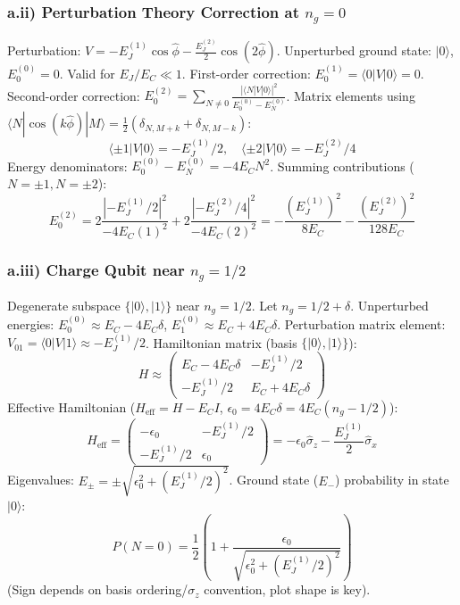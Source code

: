 \documentclass[12pt]{article}
\begin{document}
\begin{appendices}
\subsubsection*{a.ii) Perturbation Theory Correction at $n_g=0$}
\label{app:part_a:subsubsec_ii}
Perturbation: $V = -E_J^{(1)} \cos \hat{\phi} - \frac{E_J^{(2)}}{2} \cos (2 \hat{\phi})$.
Unperturbed ground state: $|0\rangle$, $E_0^{(0)}=0$. Valid for $E_J/E_C \ll 1$. %
First-order correction: $E_0^{(1)} = \langle 0 | V | 0 \rangle = 0$.
Second-order correction: $E_0^{(2)} = \sum_{N \neq 0} \frac{|\langle N | V | 0 \rangle|^2}{E_0^{(0)} - E_N^{(0)}}$.
Matrix elements using $\langle N | \cos(k\hat{\phi}) | M \rangle = \frac{1}{2}(\delta_{N, M+k} + \delta_{N, M-k})$:
\[ \langle \pm 1 | V | 0 \rangle = -E_J^{(1)}/2, \quad \langle \pm 2 | V | 0 \rangle = -E_J^{(2)}/4 \]
Energy denominators: $E_0^{(0)} - E_N^{(0)} = -4 E_C N^2$.
Summing contributions ($N=\pm 1, N=\pm 2$):
\[ E_0^{(2)} = 2 \frac{|-E_J^{(1)}/2|^2}{-4 E_C (1)^2} + 2 \frac{|-E_J^{(2)}/4|^2}{-4 E_C (2)^2} = -\frac{(E_J^{(1)})^2}{8 E_C} - \frac{(E_J^{(2)})^2}{128 E_C} \]

\subsubsection*{a.iii) Charge Qubit near $n_g=1/2$}
\label{app:part_a:subsubsec_iii}
Degenerate subspace $\{|0\rangle, |1\rangle\}$ near $n_g=1/2$. Let $n_g = 1/2 + \delta$.
Unperturbed energies: $E_0^{(0)} \approx E_C - 4E_C\delta$, $E_1^{(0)} \approx E_C + 4E_C\delta$.
Perturbation matrix element: $V_{01} = \langle 0 | V | 1 \rangle \approx -E_J^{(1)}/2$.
Hamiltonian matrix (basis $\{|0\rangle, |1\rangle\}$):
\[ H \approx \begin{pmatrix} E_C - 4E_C\delta & -E_J^{(1)}/2 \\ -E_J^{(1)}/2 & E_C + 4E_C\delta \end{pmatrix} \]
Effective Hamiltonian ($H_{\text{eff}} = H - E_C I$, $\epsilon_0 = 4 E_C \delta = 4 E_C (n_g - 1/2)$):
\[ H_{\text{eff}} = \begin{pmatrix} -\epsilon_0 & -E_J^{(1)}/2 \\ -E_J^{(1)}/2 & \epsilon_0 \end{pmatrix} = -\epsilon_0 \hat{\sigma}_z - \frac{E_J^{(1)}}{2} \hat{\sigma}_x \]
Eigenvalues: $E_{\pm} = \pm \sqrt{\epsilon_0^2 + (E_J^{(1)}/2)^2}$.
Ground state ($E_-$) probability in state $|0\rangle$:
\[ P(N=0) = \frac{1}{2} \left( 1 + \frac{\epsilon_0}{\sqrt{\epsilon_0^2 + (E_J^{(1)}/2)^2}} \right) \]
(Sign depends on basis ordering/$\sigma_z$ convention, plot shape is key).


\end{appendices}
\end{document}
